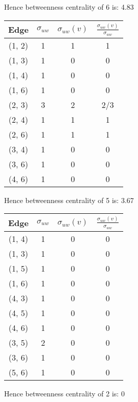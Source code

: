 \documentclass{article}
\begin{document}
\begin{itemize}
Hence betweenness centrality of 6 is: 4.83

\begin{center}
\begin{tabular}{|c|c|c|c|}
    \hline
    Edge & $\sigma_{uw}$ & $\sigma_{uw}(v)$ & $\frac{\sigma_{uw}(v)}{\sigma_{uw}}$ \\
    \hline
    (1, 2) & 1 & 1 & 1 \\
    (1, 3) & 1 & 0 & 0 \\
    (1, 4) & 1 & 0 & 0 \\
    (1, 6) & 1 & 0 & 0 \\
    (2, 3) & 3 & 2 & 2/3 \\
    (2, 4) & 1 & 1 & 1 \\
    (2, 6) & 1 & 1 & 1 \\
    (3, 4) & 1 & 0 & 0 \\
    (3, 6) & 1 & 0 & 0 \\
    (4, 6) & 1 & 0 & 0 \\
    \hline
\end{tabular}    
\end{center}

Hence betweenness centrality of 5 is: 3.67

\begin{center}
\begin{tabular}{|c|c|c|c|}
    \hline
    Edge & $\sigma_{uw}$ & $\sigma_{uw}(v)$ & $\frac{\sigma_{uw}(v)}{\sigma_{uw}}$ \\
    \hline
    (1, 4) & 1 & 0 & 0 \\
    (1, 3) & 1 & 0 & 0 \\
    (1, 5) & 1 & 0 & 0 \\
    (1, 6) & 1 & 0 & 0 \\
    (4, 3) & 1 & 0 & 0 \\
    (4, 5) & 1 & 0 & 0 \\
    (4, 6) & 1 & 0 & 0 \\
    (3, 5) & 2 & 0 & 0 \\
    (3, 6) & 1 & 0 & 0 \\
    (5, 6) & 1 & 0 & 0 \\
    \hline
\end{tabular}    
\end{center}

Hence betweenness centrality of 2 is: 0


\end{itemize}
\end{document}
